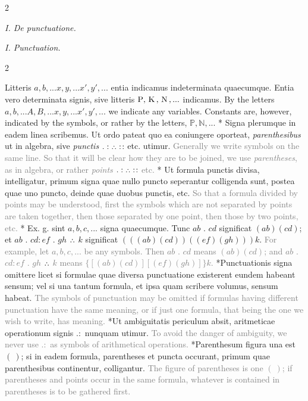 \documentclass{book}
\newcommand{\pppNoSpace}{\leavevmode\lower0ex\hbox{.}\kern-0.1em\raise0.7ex\hbox{.}\kern-0.1em\lower0ex\hbox{.}} %
\newcommand{\K}{\mathop{\thinspace \text{K} \thinspace}}
\newcommand{\N}{\mathop{\thinspace \text{N} \thinspace}}
\newcommand\irrelavent[1]{\textcolor{gray}{#1}}
\newcommand\peanoHeadingSmall[1]{ \vspace{0.75cm} \textit{#1} \nopagebreak[4]

\vspace{0.25cm} \nopagebreak[1]}
\newenvironment{translateTwoCol}
               { %
                 \columnratio{0.5, 0.5} \begin{paracol}{2}
                 \newcommand{\LAT}{\switchcolumn[0]*}
                 \newcommand{\ENG}{\switchcolumn[1]}
               }
               { %
                 \let\ENG\undefined
                 \let\LAT\undefined
                 \end{paracol}
               }
\begin{document}
\begin{translateTwoCol}
\centering
{}
{}
\peanoHeadingSmall{I. De punctuatione.}
\ENG
\peanoHeadingSmall{I. Punctuation.}
\end{translateTwoCol}

\begin{translateTwoCol}
Litteris $a,b,... x,y,... x', y',...$ entia indicamus indeterminata quaecumque. Entia vero determinata signis, sive litteris $\text{P}, \K, \N,...$ indicamus.
\ENG
By the letters $a,b,... A,B,... x,y,... x', y',...$ we indicate any variables. Constants are, however, indicated by the symbols, or rather by the letters, $\mathbb{P}, \mathbb{N},...$  %
\LAT
Signa plerumque in eadem linea scribemus. Ut ordo pateat quo ea coniungere oporteat, \emph{parenthesibus} ut in algebra, sive \emph{punctis} $. : \pppNoSpace :\hspace{0.1em}:$ etc. utimur.
\ENG
\irrelavent{Generally we write symbols on the same line. So that it will be clear how they are to be joined, we use \emph{parentheses}, as in algebra, or rather \emph{points} $. : \pppNoSpace :\hspace{0.1em}:$ etc.}
\LAT
Ut formula punctis divisa, intelligatur, primum signa quae nullo puncto seperantur colligenda sunt, postea quae uno puncto, deinde quae duobus punctis, etc.
\ENG
\irrelavent{So that a formula divided by points may be understood, first the symbols which are not separated by points are taken together, then those separated by one point, then those by two points, etc.}
\LAT
Ex. g. sint $a,b,c,...$ signa quaecumque. Tunc $ab$ $.$ $cd$ significat $(ab)(cd)$; et $ab$ $.$ $cd:ef$ $.$ $gh$ $\pppNoSpace$ $k$ significat $(((ab)(cd))((ef)(gh)))k$.
\ENG
\irrelavent{For example, let $a,b,c,...$ be any symbols. Then $ab$ $.$ $cd$ means $(ab)(cd)$; and $ab$ $.$ $cd:ef$ $.$ $gh$ $\pppNoSpace$ $k$ means $\{[(ab)(cd)][(ef)(gh)]\}k$.}
\LAT Punctuationis signa omittere licet si formulae quae diversa punctuatione existerent eundem habeant sensum; vel si una tantum formula, et ipsa quam scribere volumus, sensum habeat.
\ENG \irrelavent{The symbols of punctuation may be omitted if formulas having different punctuation have the same meaning, or if just one formula, that being the one we wish to write, has meaning.}
\LAT Ut ambiguitatis periculum absit, aritmeticae operationum signis $. :$ nunquam utimur.
\ENG \irrelavent{To avoid the danger of ambiguity, we never use $. :$ as symbols of arithmetical operations.}
\LAT Parenthesum figura una est $( \ )$; si in eadem formula, parentheses et puncta occurant, primum quae parenthesibus continentur, colligantur.
\ENG \irrelavent{The figure of parentheses is one $( \ )$; if parentheses and points occur in the same formula, whatever is contained in parentheses is to be gathered first.}
\end{translateTwoCol}
\end{document}

